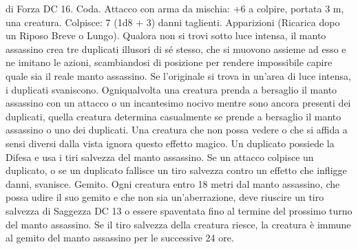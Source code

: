 \begin{multicols}{2}
di Forza DC 16.
Coda. Attacco con arma da mischia: +6 a colpire, portata 3 m,
una creatura.
Colpisce: 7 (1d8 + 3) danni taglienti.
Apparizioni (Ricarica dopo un Riposo Breve o Lungo). Qualora
non si trovi sotto luce intensa, il manto assassino crea tre
duplicati illusori di sé stesso, che si muovono assieme ad esso e
ne imitano le azioni, scambiandosi di posizione per rendere
impossibile capire quale sia il reale manto assassino. Se
l'originale si trova in un’area di luce intensa, i duplicati
svaniscono.
Ogniqualvolta una creatura prenda a bersaglio il manto assassino
con un attacco o un incantesimo nocivo mentre sono ancora
presenti dei duplicati, quella creatura determina casualmente se
prende a bersaglio il manto assassino o uno dei duplicati. Una
creatura che non possa vedere o che si affida a sensi diversi dalla
vista ignora questo effetto magico.
Un duplicato possiede la Difesa e usa i tiri salvezza del manto assassino.
Se un attacco colpisce un duplicato, o se un duplicato fallisce un tiro
salvezza contro un effetto che infligge danni, svanisce.
Gemito. Ogni creatura entro 18 metri dal manto assassino, che possa
udire il suo gemito e che non sia un’aberrazione, deve riuscire un tiro
salvezza di Saggezza DC 13 o essere spaventata fino al termine del
prossimo turno del manto assassino. Se il tiro salvezza della creatura
riesce, la creatura è immune al gemito del manto assassino per le
successive 24 ore.
 

\end{multicols}
